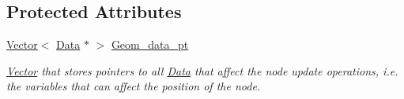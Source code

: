 \subsection*{Protected Attributes}
\begin{DoxyCompactItemize}
\item 
\hyperlink{classoomph_1_1Vector}{Vector}$<$ \hyperlink{classoomph_1_1Data}{Data} $\ast$ $>$ \hyperlink{classoomph_1_1ElementWithMovingNodes_a18986c6ad81149cf779a2d930825dad5}{Geom\+\_\+data\+\_\+pt}
\begin{DoxyCompactList}\small\item\em \hyperlink{classoomph_1_1Vector}{Vector} that stores pointers to all \hyperlink{classoomph_1_1Data}{Data} that affect the node update operations, i.\+e. the variables that can affect the position of the node. \end{DoxyCompactList}\end{DoxyCompactItemize}
